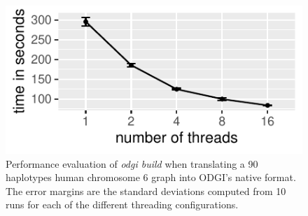 \begin{figure}[ht!]
	\centering
	\includegraphics[width=\linewidth]{fig/build/mean_build_time.pdf}
	\caption{Performance evaluation of \textit{odgi build} when translating a 90 haplotypes human chromosome 6 graph into ODGI's native format. The error margins are the standard deviations computed from 10 runs for each of the different threading configurations.}
	\label{fig:build}
\end{figure}
